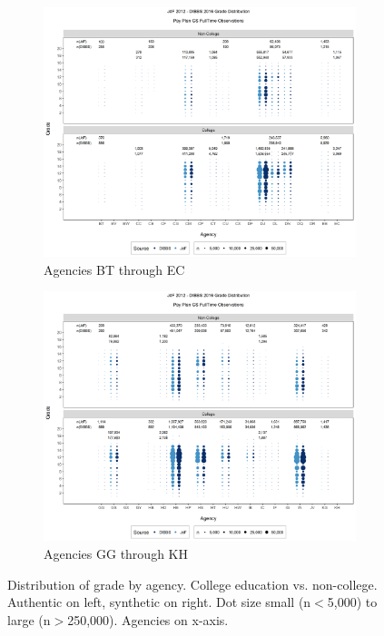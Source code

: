 \documentclass[10pt, letterpaper]{article}
\begin{document}
\begin{spacing}{1.0}
\clearpage

\begin{figure}[]
    \centering
    \begin{subfigure}{1\textwidth}
        \centering
        \includegraphics[width=6in, trim={0 200px 0 165px}, clip]{JdFDIBBSGSFullTimeGradeCollegeAgency21.png}
        \caption{Agencies BT through EC}
        \vspace{20pt}
    \end{subfigure}
    \begin{subfigure}{1\textwidth}
        \centering
        \includegraphics[width=6in, trim={0 200px 0 165px}, clip]{JdFDIBBSGSFullTimeGradeCollegeAgency61.png}
        \caption{Agencies GG through KH}
        \vspace{10pt}
    \end{subfigure}
    \caption{Distribution of grade by agency.  College education vs. non-college.  Authentic on left, synthetic on right.  Dot size small (n$<$5,000) to large (n$>$250,000).  Agencies on x-axis.}
    \label{figure:JdFDIBBSGSFullTimeGradeCollegeAgency}
\end{figure}


\end{spacing}
\end{document}
